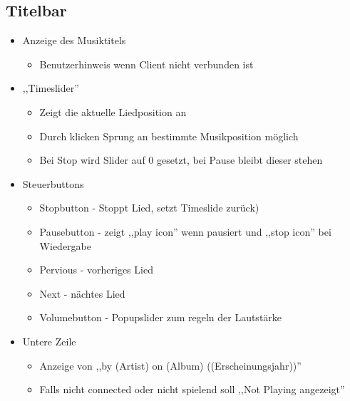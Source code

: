 
\subsection{Titelbar}
\begin{itemize}
	\item Anzeige des Musiktitels
	\begin{itemize}
		\item Benutzerhinweis wenn Client nicht verbunden ist
	\end{itemize}
	\item ,,Timeslider''
	\begin{itemize}
		\item Zeigt die aktuelle Liedposition an
		\item Durch klicken Sprung an bestimmte Musikposition möglich
		\item Bei Stop wird Slider auf 0 gesetzt, bei Pause  bleibt dieser stehen
	\end{itemize}
	
	\item Steuerbuttons
	\begin{itemize}
		\item Stopbutton - Stoppt Lied, setzt Timeslide zurück)
		\item Pausebutton - zeigt ,,play icon'' wenn pausiert und ,,stop icon'' bei Wiedergabe
		\item Pervious - vorheriges Lied
		\item Next - nächtes Lied
		\item Volumebutton - Popupslider zum regeln der Lautstärke
	\end{itemize}
	\item Untere Zeile
	\begin{itemize}
               \item Anzeige von ,,by (Artist) on (Album) ((Erscheinungsjahr))''
               \item Falls nicht connected oder nicht spielend soll ,,Not Playing angezeigt''
        \end{itemize}		
\end{itemize} 


